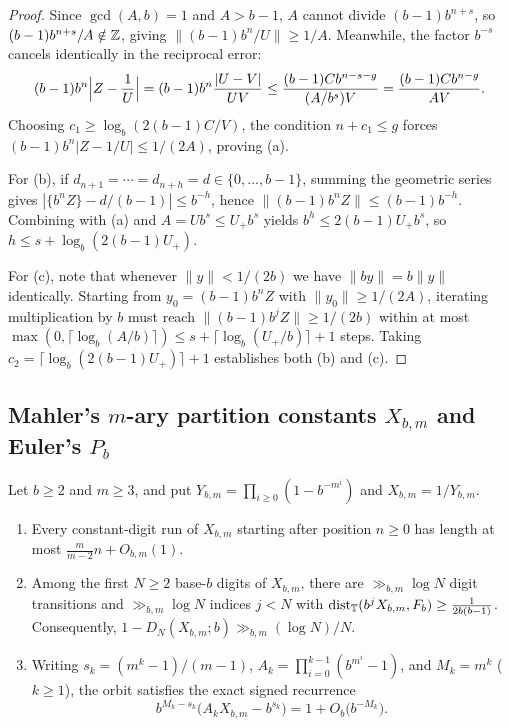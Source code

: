 \documentclass[11pt]{article}
\newcommand{\dist}[1]{\lVert #1\rVert}
\newcommand{\fr}[1]{\{#1\}}
\begin{document}
\begin{proof}
Since $\gcd(A,b)=1$ and $A>b-1$, $A$ cannot divide $(b-1)b^{n+s}$, so $(b-1)b^{n+s}/A\notin\mathbb Z$, giving $\dist{(b-1)b^n/U}\ge 1/A$. Meanwhile, the factor $b^{-s}$ cancels identically in the reciprocal error:
\[
(b-1)b^n\Bigl|Z-\frac1U\Bigr|
=(b-1)b^n\frac{|U-V|}{UV}
\le\frac{(b-1)C b^{n-s-g}}{(A/b^s)V}
=\frac{(b-1)C b^{n-g}}{AV}.
\]
Choosing $c_1\ge\log_b(2(b-1)C/V)$, the condition $n+c_1\le g$ forces $(b-1)b^n|Z-1/U|\le 1/(2A)$, proving (a).

For (b), if $d_{n+1}=\cdots=d_{n+h}=d\in\{0,\dots,b-1\}$, summing the geometric series gives $|\fr{b^nZ}-d/(b-1)|\le b^{-h}$, hence $\dist{(b-1)b^nZ}\le(b-1)b^{-h}$. Combining with (a) and $A=Ub^s\le U_+b^s$ yields $b^h\le 2(b-1)U_+b^s$, so $h\le s+\log_b(2(b-1)U_+)$.

For (c), note that whenever $\dist{y}<1/(2b)$ we have $\dist{by}=b\dist{y}$ identically. Starting from $y_0=(b-1)b^nZ$ with $\dist{y_0}\ge 1/(2A)$, iterating multiplication by $b$ must reach $\dist{(b-1)b^jZ}\ge 1/(2b)$ within at most $\max(0,\lceil\log_b(A/b)\rceil)\le s+\lceil\log_b(U_+/b)\rceil+1$ steps. Taking $c_2=\lceil\log_b(2(b-1)U_+)\rceil+1$ establishes both (b) and (c).
\end{proof}

\subsection{Mahler's \texorpdfstring{$m$-ary partition constants $X_{b,m}$ and Euler's $P_b$}{m-ary partition constants X(b,m) and Euler's P(b)}}

\begin{theorem}\label{thm:mahler}
Let $b\ge2$ and $m\ge3$, and put $Y_{b,m}=\prod_{i\ge0}(1-b^{-m^i})$ and $X_{b,m}=1/Y_{b,m}$.
\begin{enumerate}[label=\textup{(\alph*)},nosep]
\item Every constant-digit run of $X_{b,m}$ starting after position $n\ge0$ has length at most $\frac{m}{m-2}n+O_{b,m}(1)$.
\item Among the first $N\ge2$ base-$b$ digits of $X_{b,m}$, there are $\gg_{b,m}\log N$ digit transitions and $\gg_{b,m}\log N$ indices $j<N$ with $\operatorname{dist}_{\mathbb T}(b^jX_{b,m},F_b)\ge\frac{1}{2b(b-1)}$. Consequently, $1-D_N(X_{b,m};b)\gg_{b,m}(\log N)/N$.
\item Writing $s_k=(m^k-1)/(m-1)$, $A_k=\prod_{i=0}^{k-1}(b^{m^i}-1)$, and $M_k=m^k$ ($k\ge1$), the orbit satisfies the exact signed recurrence
\begin{equation}\label{eq:mahler-rec}
b^{M_k-s_k}\bigl(A_k X_{b,m}-b^{s_k}\bigr)=1+O_b\bigl(b^{-M_k}\bigr).
\end{equation}
\end{enumerate}
\end{theorem}
\end{document}
